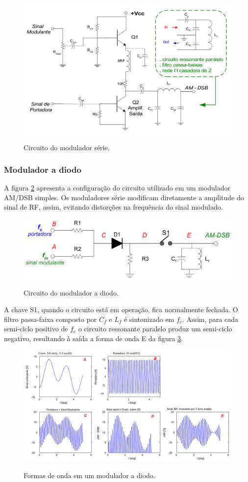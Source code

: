 \begin{figure}[H]
    \centering
    \caption{Circuito do modulador série.}
    \includegraphics[scale=0.4]{Imagens/mod_am_serie.png}
    \label{f_mod_am_serie}
\end{figure}

\subsubsection{Modulador a diodo}

A figura \ref{f_mod_am_diodo} apresenta a configuração do circuito utilizado em um modulador AM/DSB simples.
Os moduladores série modificam diretamente a amplitude do sinal de RF, assim, evitando distorções na frequência do sinal modulado.

\begin{figure}[H]
    \centering
    \caption{Circuito do modulador a diodo.}
    \includegraphics[scale=0.4]{Imagens/mod_am_diodo.png}
    \label{f_mod_am_diodo}
\end{figure}

A chave S1, quando o circuito está em operação, fica normalmente fechada.
O filtro passa-faixa composto por $C_f$ e $L_f$ é sintonizado em $f_c$. Assim, para cada semi-ciclo positivo de $f_c$ o circuito ressonante paralelo produz um semi-ciclo negativo, resultando à saída a forma de
onda E da figura \ref{f_mod_am_diodo_ex}.



\begin{figure}[H]
    \centering
    \caption{Formas de onda em um modulador a diodo.}
    \includegraphics[scale=0.4]{Imagens/mod_am_diodo_ex.png}
    \label{f_mod_am_diodo_ex}
\end{figure}